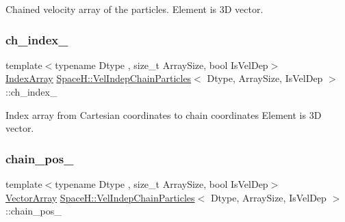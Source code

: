 Chained velocity array of the particles. Element is 3D vector. 

\mbox{\label{class_space_h_1_1_vel_indep_chain_particles_a4801898e53bf6ece4ed588e03646b8a8}} 
\subsubsection{\texorpdfstring{ch\+\_\+index\+\_\+}{ch\_index\_}}
{\footnotesize\ttfamily template$<$typename Dtype , size\+\_\+t Array\+Size, bool Is\+Vel\+Dep$>$ \\
\mbox{\hyperlink{class_space_h_1_1_vel_indep_chain_particles_a48b9183f8d68fe8af42bf405125d450c}{Index\+Array}} \mbox{\hyperlink{class_space_h_1_1_vel_indep_chain_particles}{Space\+H\+::\+Vel\+Indep\+Chain\+Particles}}$<$ Dtype, Array\+Size, Is\+Vel\+Dep $>$\+::ch\+\_\+index\+\_\+\hspace{0.3cm}{\ttfamily [protected]}}



Index array from Cartesian coordinates to chain coordinates Element is 3D vector. 

\mbox{\label{class_space_h_1_1_vel_indep_chain_particles_a6426404ff1098f28e34b9867c3b64e0c}} 
\subsubsection{\texorpdfstring{chain\+\_\+pos\+\_\+}{chain\_pos\_}}
{\footnotesize\ttfamily template$<$typename Dtype , size\+\_\+t Array\+Size, bool Is\+Vel\+Dep$>$ \\
\mbox{\hyperlink{class_space_h_1_1_vel_indep_particles_aa9983058940249df8b00fa800e8cbad2}{Vector\+Array}} \mbox{\hyperlink{class_space_h_1_1_vel_indep_chain_particles}{Space\+H\+::\+Vel\+Indep\+Chain\+Particles}}$<$ Dtype, Array\+Size, Is\+Vel\+Dep $>$\+::chain\+\_\+pos\+\_\+\hspace{0.3cm}{\ttfamily [protected]}}



